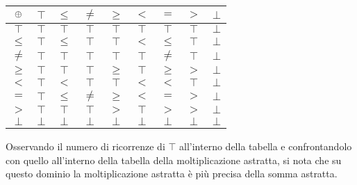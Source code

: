 \begin{center}
	\begin{tabular}{c | c c c c c c c c}
		$\mathbin{\oplus}$ & $\top$ & $\leq$ & $\neq$ & $\geq$ & $<$ & $=$ & $>$ & $\bot$ \\
		\hline
		$\top$ & $\top$ & $\top$ & $\top$ & $\top$ & $\top$ & $\top$ & $\top$ & $\bot$ \\
		$\leq$ & $\top$ & $\leq$ & $\top$ & $\top$ & $<$ & $\leq$ & $\top$ & $\bot$\\
		$\neq$ & $\top$ & $\top$ & $\top$ & $\top$ & $\top$ & $\neq$ & $\top$ & $\bot$ \\
		$\geq$ & $\top$ & $\top$ & $\top$ & $\geq$ & $\top$ & $\geq$ & $>$ & $\bot$\\
		$<$ & $\top$ & $<$ & $\top$ & $\top$ & $<$ & $<$ & $\top$ & $\bot$\\
		$=$ & $\top$ & $\leq$ & $\neq$ & $\geq$ & $<$ & $=$ & $>$ & $\bot$\\
		$>$ & $\top$ & $\top$ & $\top$ & $>$ & $\top$ & $>$ & $>$ & $\bot$ \\
		$\bot$ & $\bot$ & $\bot$ & $\bot$ & $\bot$ & $\bot$ & $\bot$ & $\bot$ & $\bot$
	\end{tabular}
\end{center}

Osservando il numero di ricorrenze di $\top$ all'interno della tabella
e confrontandolo con quello all'interno della tabella
della moltiplicazione astratta, si nota che su questo dominio
la moltiplicazione astratta è più precisa della somma astratta.

